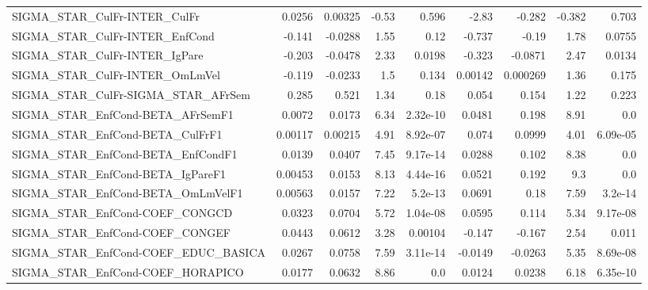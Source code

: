 \begin{tabular}{lrrrrrrrr}
SIGMA\_STAR\_CulFr-INTER\_CulFr          &      0.0256 &      0.00325 &   -0.53 &    0.596 &      -2.83 &      -0.282 &       -0.382 &         0.703 \\
SIGMA\_STAR\_CulFr-INTER\_EnfCond        &      -0.141 &      -0.0288 &    1.55 &     0.12 &     -0.737 &       -0.19 &         1.78 &        0.0755 \\
SIGMA\_STAR\_CulFr-INTER\_IgPare         &      -0.203 &      -0.0478 &    2.33 &   0.0198 &     -0.323 &     -0.0871 &         2.47 &        0.0134 \\
SIGMA\_STAR\_CulFr-INTER\_OmLmVel        &      -0.119 &      -0.0233 &     1.5 &    0.134 &    0.00142 &    0.000269 &         1.36 &         0.175 \\
SIGMA\_STAR\_CulFr-SIGMA\_STAR\_AFrSem    &       0.285 &        0.521 &    1.34 &     0.18 &      0.054 &       0.154 &         1.22 &         0.223 \\
SIGMA\_STAR\_EnfCond-BETA\_AFrSemF1      &      0.0072 &       0.0173 &    6.34 & 2.32e-10 &     0.0481 &       0.198 &         8.91 &           0.0 \\
SIGMA\_STAR\_EnfCond-BETA\_CulFrF1       &     0.00117 &      0.00215 &    4.91 & 8.92e-07 &      0.074 &      0.0999 &         4.01 &      6.09e-05 \\
SIGMA\_STAR\_EnfCond-BETA\_EnfCondF1     &      0.0139 &       0.0407 &    7.45 & 9.17e-14 &     0.0288 &       0.102 &         8.38 &           0.0 \\
SIGMA\_STAR\_EnfCond-BETA\_IgPareF1      &     0.00453 &       0.0153 &    8.13 & 4.44e-16 &     0.0521 &       0.192 &          9.3 &           0.0 \\
SIGMA\_STAR\_EnfCond-BETA\_OmLmVelF1     &     0.00563 &       0.0157 &    7.22 &  5.2e-13 &     0.0691 &        0.18 &         7.59 &       3.2e-14 \\
SIGMA\_STAR\_EnfCond-COEF\_CONGCD        &      0.0323 &       0.0704 &    5.72 & 1.04e-08 &     0.0595 &       0.114 &         5.34 &      9.17e-08 \\
SIGMA\_STAR\_EnfCond-COEF\_CONGEF        &      0.0443 &       0.0612 &    3.28 &  0.00104 &     -0.147 &      -0.167 &         2.54 &         0.011 \\
SIGMA\_STAR\_EnfCond-COEF\_EDUC\_BASICA   &      0.0267 &       0.0758 &    7.59 & 3.11e-14 &    -0.0149 &     -0.0263 &         5.35 &      8.69e-08 \\
SIGMA\_STAR\_EnfCond-COEF\_HORAPICO      &      0.0177 &       0.0632 &    8.86 &      0.0 &     0.0124 &      0.0238 &         6.18 &      6.35e-10 \\

\end{tabular}
